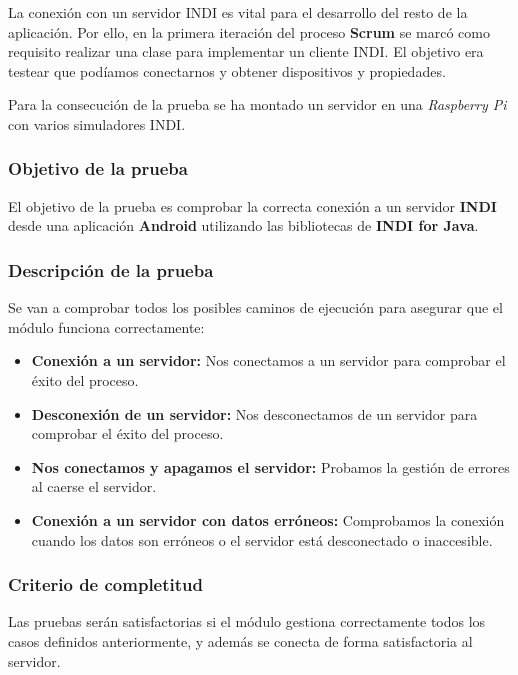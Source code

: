 La conexión con un servidor INDI es vital para el desarrollo del resto de la aplicación. Por ello, en la primera iteración del proceso \textbf{Scrum} se marcó como requisito realizar una clase para implementar un cliente INDI. El objetivo era testear que podíamos conectarnos y obtener dispositivos y propiedades.

\bigskip
Para la consecución de la prueba se ha montado un servidor en una \textit{Raspberry Pi} con varios simuladores INDI.

\subsubsection{Objetivo de la prueba}

El objetivo de la prueba es comprobar la correcta conexión a un servidor \textbf{INDI} desde una aplicación \textbf{Android} utilizando las bibliotecas de \textbf{INDI for Java}.

\subsubsection{Descripción de la prueba}

Se van a comprobar todos los posibles caminos de ejecución para asegurar que el módulo funciona correctamente:

\begin{itemize}
  \item \textbf{Conexión a un servidor:} Nos conectamos a un servidor para comprobar el éxito del proceso.
  \item \textbf{Desconexión de un servidor:} Nos desconectamos de un servidor para comprobar el éxito del proceso.
  \item \textbf{Nos conectamos y apagamos el servidor:} Probamos la gestión de errores al caerse el servidor.
  \item \textbf{Conexión a un servidor con datos erróneos:} Comprobamos la conexión cuando los datos son erróneos o el servidor está desconectado o inaccesible.
\end{itemize}

\subsubsection{Criterio de completitud}

Las pruebas serán satisfactorias si el módulo gestiona correctamente todos los casos definidos anteriormente, y además se conecta de forma satisfactoria al servidor.

